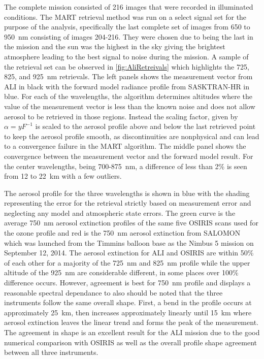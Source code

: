 The complete mission consisted of 216 images that were recorded in illuminated conditions. The MART retrieval method was run on a select signal set for the purpose of the analysis, specifically the last complete set of images from 650 to 950~nm consisting of images 204-216. They were chosen due to being the last in the mission and the sun was the highest in the sky giving the brightest atmosphere leading to the best signal to noise during the mission. A sample of the retrieval set can be observed in \autoref{fig:AliRetreivals} which highlights the 725, 825, and 925~nm retrievals. The left panels shows the measurement vector from ALI in black with the forward model radiance profile from SASKTRAN-HR in blue. For each of the wavelengths, the algorithm determines altitudes where the value of the measurement vector is less than the known noise and does not allow aerosol to be retrieved in those regions. Instead the scaling factor, given by $\alpha = yF^{-1}$ is scaled to the aerosol profile above and below the last retrieved point to keep the aerosol profile smooth, as discontinuities are nonphysical and can lead to a convergence failure in the MART algorithm. The middle panel shows the convergence between the measurement vector and the forward model result. For the center wavelengths, being 700-875~nm, a difference of less than 2\% is seen from 12 to 22~km with a few outliers.

The aerosol profile for the three wavelengths is shown in blue with the shading representing the error for the retrieval strictly based on measurement error and neglecting any model and atmospheric state errors. The green curve is the average 750~nm aerosol extinction profiles of the same five OSIRIS scans used for the ozone profile and red is the 750~nm aerosol extinction from SALOMON \citep{Berthet2002} which was launched from the Timmins balloon base as the Nimbus 5 mission on September 12, 2014. The aerosol extinction for ALI and OSIRIS are within 50\% of each other for a majority of the 725~nm and 825~nm profile while the upper altitude of the 925~nm are considerable different, in some places over 100\% difference occurs. However, agreement is best for 750~nm profile and displays a reasonable spectral dependance to also should be noted that the three instruments follow the same overall shape.  First, a bend in the profile occurs at approximately 25~km, then increases approximately linearly until 15~km where aerosol extinction leaves the linear trend and forms the peak of the measurement. The agreement in shape is an excellent result for the ALI mission due to the good numerical comparison with OSIRIS as well as the overall profile shape agreement between all three instruments.

